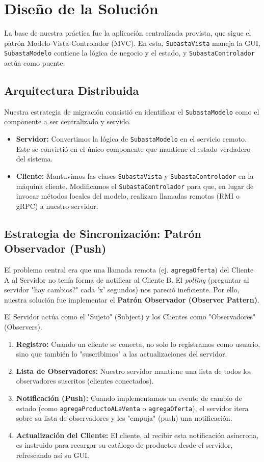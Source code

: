 \documentclass[11pt, a4paper]{article}
\begin{document}
\section{Diseño de la Solución}
\label{sec:diseno}

La base de nuestra práctica fue la aplicación centralizada provista, que sigue el patrón Modelo-Vista-Controlador (MVC).
En esta, \texttt{SubastaVista} maneja la GUI, \texttt{SubastaModelo} contiene la lógica de negocio y el estado, y \texttt{SubastaControlador} actúa como puente.

\subsection{Arquitectura Distribuida}
Nuestra estrategia de migración consistió en identificar el \texttt{SubastaModelo} como el componente a ser centralizado y servido.
\begin{itemize}
    \item \textbf{Servidor:} Convertimos la lógica de \texttt{SubastaModelo} en el servicio remoto.
Este se convirtió en el único componente que mantiene el estado verdadero del sistema.
\item \textbf{Cliente:} Mantuvimos las clases \texttt{SubastaVista} y \texttt{SubastaControlador} en la máquina cliente.
Modificamos el \texttt{SubastaControlador} para que, en lugar de invocar métodos locales del modelo, realizara llamadas remotas (RMI o gRPC) a nuestro servidor.
\end{itemize}

\subsection{Estrategia de Sincronización: Patrón Observador (Push)}
El problema central era que una llamada remota (ej. \texttt{agregaOferta}) del Cliente A al Servidor no tenía forma de notificar al Cliente B.
El \textit{polling} (preguntar al servidor "hay cambios?" cada 'x' segundos) nos pareció ineficiente. Por ello, nuestra solución fue implementar el \textbf{Patrón Observador (Observer Pattern)}.

El Servidor actúa como el "Sujeto" (Subject) y los Clientes como "Observadores" (Observers).
\begin{enumerate}
    \item \textbf{Registro:} Cuando un cliente se conecta, no solo lo registramos como usuario, sino que también lo "suscribimos" a las actualizaciones del servidor.
\item \textbf{Lista de Observadores:} Nuestro servidor mantiene una lista de todos los observadores suscritos (clientes conectados).
\item \textbf{Notificación (Push):} Cuando implementamos un evento de cambio de estado (como \texttt{agregaProductoALaVenta} o \texttt{agregaOferta}), el servidor itera sobre su lista de observadores y les "empuja" (push) una notificación.
\item \textbf{Actualización del Cliente:} El cliente, al recibir esta notificación asíncrona, es instruido para recargar su catálogo de productos desde el servidor, refrescando así su GUI.
\end{enumerate}
\end{document}

